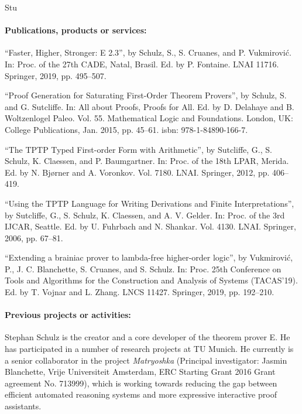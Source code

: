 \begin{sitedescription}{Stu}
\paragraph*{Publications, products or services:}


\begin{compactitem}
\item “Faster, Higher, Stronger: E 2.3”, by Schulz, S., S. Cruanes, and P. Vukmirović. In: Proc. of the 27th CADE,
Natal, Brasil. Ed. by P. Fontaine. LNAI 11716. Springer, 2019, pp. 495–507.
\item “Proof Generation for Saturating First-Order Theorem Provers”, by Schulz, S. and G. Sutcliffe. In: All about
Proofs, Proofs for All. Ed. by D. Delahaye and B. Woltzenlogel Paleo. Vol. 55. Mathematical Logic
and Foundations. London, UK: College Publications, Jan. 2015, pp. 45–61. isbn: 978-1-84890-166-7.
\item “The TPTP Typed First-order Form with
Arithmetic”, by Sutcliffe, G., S. Schulz, K. Claessen, and P. Baumgartner. In: Proc. of the 18th LPAR, Merida. Ed. by N. Bjørner and A. Voronkov. Vol. 7180.
LNAI. Springer, 2012, pp. 406–419.
\item “Using the TPTP Language for Writing Derivations
and Finite Interpretations”, by Sutcliffe, G., S. Schulz, K. Claessen, and A. V. Gelder. In: Proc. of the 3rd IJCAR, Seattle. Ed. by U. Fuhrbach and N. Shankar.
Vol. 4130. LNAI. Springer, 2006, pp. 67–81.
\item “Extending a brainiac prover to lambda-free
higher-order logic”, by Vukmirović, P., J. C. Blanchette, S. Cruanes, and S. Schulz. In: Proc. 25th Conference on Tools and Algorithms for the Construction and
Analysis of Systems (TACAS’19). Ed. by T. Vojnar and L. Zhang. LNCS 11427. Springer, 2019,
pp. 192–210.
\end{compactitem}

\paragraph*{Previous projects or activities:}

\begin{compactitem}
\item Stephan Schulz is the creator and a core developer of the theorem
prover E.  He has participated in a number of research projects at TU
Munich. He currently is a senior collaborator in the project
\emph{Matryoshka} (Principal investigator: Jasmin Blanchette, Vrije
Universiteit Amsterdam, ERC Starting Grant 2016 Grant agreement
No. 713999), which is working towards reducing the gap between
efficient automated reasoning systems and more expressive interactive
proof assistants.
\end{compactitem}


\end{sitedescription}
